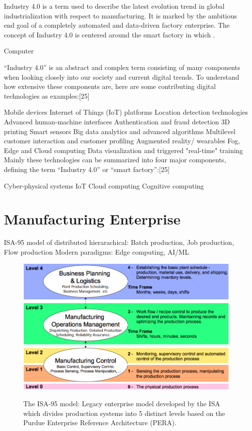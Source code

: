 Industry 4.0 is a term used to describe the latest evolution trend in global industrialization with respect to manufacturing.  It is marked by the ambitious end goal of a completely automated and data-driven factory enterprise.  The concept of Industry 4.0 is centered around the smart factory in which . 

Computer

“Industry 4.0” is an abstract and complex term consisting of many components when looking closely into our society and current digital trends. To understand how extensive these components are, here are some contributing digital technologies as examples:[25]

Mobile devices
Internet of Things (IoT) platforms
Location detection technologies
Advanced human-machine interfaces
Authentication and fraud detection
3D printing
Smart sensors
Big data analytics and advanced algorithms
Multilevel customer interaction and customer profiling
Augmented reality/ wearables
Fog, Edge and Cloud computing
Data visualization and triggered "real-time" training
Mainly these technologies can be summarized into four major components, defining the term “Industry 4.0” or “smart factory”:[25]

Cyber-physical systems
IoT
Cloud computing
Cognitive computing

\section{Manufacturing Enterprise}
ISA-95 model of distributed hierarachical: Batch production, Job production, Flow production
Modern paradigms: Edge computing, AI/ML


\begin{figure}[!tbp]
	\begin{center}
		\includegraphics[width=\textwidth]{./chapter-intro/images/intro/isa95-2.png}
		\label{fig:intro:isa95}
		\caption{The ISA-95 model: Legacy enterprise model developed by the ISA which divides production systems into 5 distinct levels based on the Purdue Enterprise Reference Architecture (PERA).}
	\end{center}
\end{figure}

